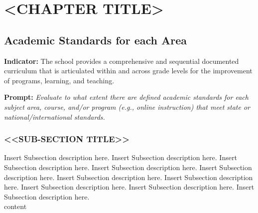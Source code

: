 \AddToShipoutPicture*{\BackgroundPic}
\chapter{<CHAPTER TITLE>}
\newpage
\section{Academic Standards for each Area  }\label{sec:first}
\textbf{Indicator:}  The school provides a comprehensive and sequential documented curriculum that is articulated within and across grade levels for the improvement of programs, learning, and teaching.

\textbf{Prompt:} \textit{Evaluate to what extent there are defined academic standards for each subject area, course, and/or program (e.g., online instruction) that meet state or national/international standards.}
\\
\subsection{<<SUB-SECTION TITLE>>}
Insert Subsection description here. Insert Subsection description here. Insert Subsection description here. Insert Subsection description here. Insert Subsection description here. Insert Subsection description here. Insert Subsection description here. Insert Subsection description here. Insert Subsection description here. Insert Subsection description here. 
\\
{content}


  



